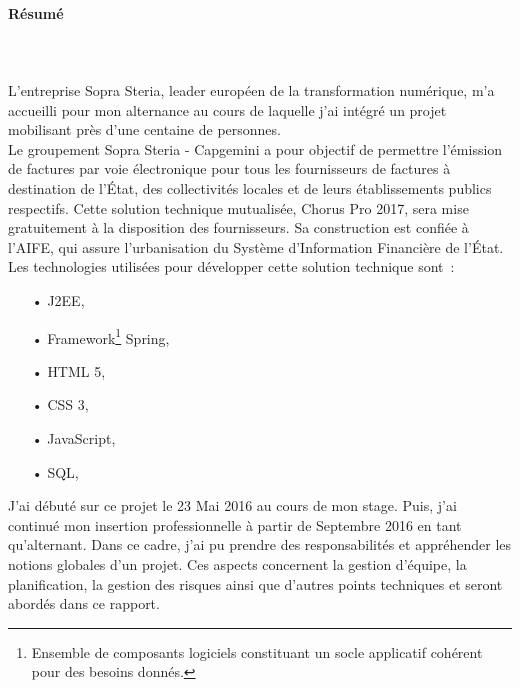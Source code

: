 \documentclass[12pt,a4paper]{article}
\begin{document}
\paragraph{Résumé}
~~\\\\
L'entreprise Sopra Steria, leader européen de la transformation numérique, m'a accueilli pour mon alternance au cours de laquelle j'ai intégré un projet mobilisant près d'une centaine de personnes.\\
Le groupement Sopra Steria - Capgemini a pour objectif de permettre l’émission de factures par voie électronique pour tous les fournisseurs de factures à destination de l’État, des collectivités locales et de leurs établissements publics respectifs.
Cette solution technique mutualisée, Chorus Pro 2017, sera mise gratuitement à la disposition des fournisseurs. Sa construction est confiée à l'\gls{AIFE}, qui assure l’urbanisation du Système d’Information Financière de l’État.
Les technologies utilisées pour développer cette solution technique sont~:
\smallbreak
\begin{itemize}
\item[•] \gls{J2EE},
\item[•] Framework\footnote{Ensemble de composants logiciels constituant un socle applicatif cohérent pour des besoins donnés.} Spring,
\item[•] \gls{HTML} 5,
\item[•] \gls{CSS} 3,
\item[•] JavaScript,
\item[•] \gls{SQL},
\end{itemize}
\medbreak
J'ai débuté sur ce projet le 23 Mai 2016 au cours de mon stage. Puis, j’ai continué mon insertion professionnelle à partir de Septembre 2016 en tant qu'alternant.
\smallbreak
Dans ce cadre, j'ai pu prendre des responsabilités et appréhender les notions globales d’un projet. Ces aspects concernent la gestion d’équipe, la planification, la gestion des risques ainsi que
d’autres points techniques et seront abordés dans ce rapport.
\newpage
\end{document}
